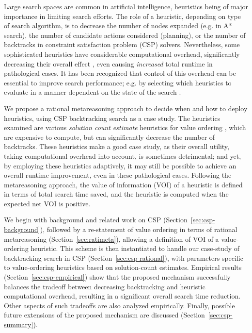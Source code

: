 

Large search spaces are common in artificial intelligence, heuristics
being of major importance in limiting search efforts.  The role of a
heuristic, depending on type of search algorithm, is to decrease the
number of nodes expanded (e.g. in A* search), the number of candidate
actions considered (planning), or the number of backtracks in
constraint satisfaction problem (CSP) solvers.  Nevertheless, some
sophisticated heuristics have considerable computational overhead,
significantly decreasing their overall effect
\cite{HorschHavens.pac,Kask.solcount}, even causing {\em increased}
total runtime in pathological cases.  It has been recognized that
control of this overhead can be essential to improve search
performance; e.g. by selecting which heuristics to evaluate in a
manner dependent on the state of the search
\cite{Wallace.macheur,Domshlak.maxornot}.

We propose a rational metareasoning approach to
decide when and how to deploy heuristics, using CSP backtracking
search as a case study.  The heuristics examined are various {\em
  solution count estimate} heuristics for value ordering
\cite{Meisels.solcount,HorschHavens.pac}, which are expensive to
compute, but can significantly decrease the number of
backtracks. These heuristics make a good case study, as their overall
utility, taking computational overhead into account, is sometimes
detrimental; and yet, by employing these heuristics adaptively, it may
still be possible to achieve an overall runtime improvement, even in
these pathological cases.  Following the metareasoning approach, the
value of information (VOI) of a heuristic is defined in terms of total
search time saved, and the heuristic is computed when the
expected net VOI is positive.

We begin with background and related work on CSP
(Section~\ref{sec:csp-background}), followed by a re-statement of
value ordering in terms of rational metareasoning
(Section~\ref{sec:ratimeta}), allowing a definition of VOI of a
value-ordering heuristic.  This scheme is then instantiated to handle
our case-study of backtracking search in CSP
(Section~\ref{sec:csp-rational}), with parameters specific to
value-ordering heuristics based on solution-count estimates.
Empirical results (Section~\ref{sec:csp-empirical}) show that the
proposed mechanism successfully balances the tradeoff between
decreasing backtracking and heuristic computational overhead,
resulting in a significant overall search time reduction.  Other
aspects of such tradeoffs are also analyzed empirically.  Finally,
possible future extensions of the proposed mechanism are discussed
(Section~\ref{sec:csp-summary}).

